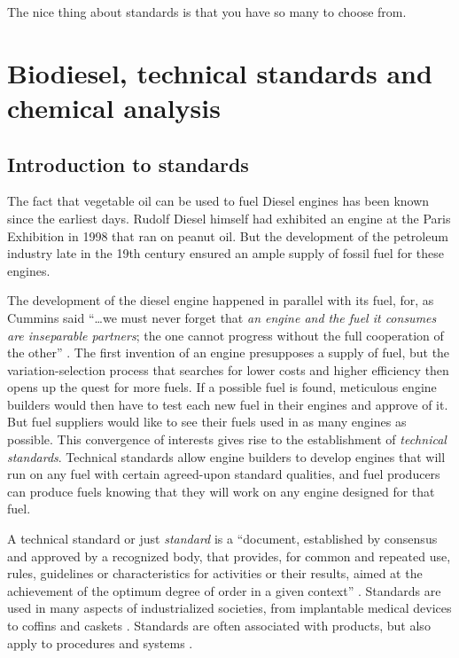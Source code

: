 
\begin{savequote}[\quotewidth]
The nice thing about standards is that you have so many to choose from.
\end{savequote}


\chapter[Biodiesel standards]{Biodiesel, technical standards and chemical analysis} %

\label{Chapter3} %

\section{Introduction to standards}
\label{Sec:Intro}

The fact that vegetable oil can be used to fuel Diesel engines has been known
since the earliest days. Rudolf Diesel himself had exhibited an engine at the
Paris Exhibition in 1998 \autocite{Knothe2010} that ran on peanut oil. But the
development of the petroleum industry late in the 19th century ensured an ample
supply of fossil fuel for these engines.

The development of the diesel engine happened in parallel with its fuel, for, as
Cummins said ``\ldots we must never forget that \textit{an engine and the fuel
it consumes are inseparable partners}; the one cannot progress without the full
cooperation of the other'' \autocite{Cummins1989}. The first invention of an
engine presupposes a supply of fuel, but the variation-selection process that
searches for lower costs and higher efficiency then opens up the quest for more
fuels. If a possible fuel is found, meticulous engine builders would then have
to test each new fuel in their engines and approve of it. But fuel suppliers
would like to see their fuels used in as many engines as possible. This
convergence of interests gives rise to the establishment of \textit{technical
standards}. Technical standards allow engine builders to develop engines that
will run on any fuel with certain agreed-upon standard qualities, and fuel
producers can produce fuels knowing that they will work on any engine designed
for that fuel.

A technical standard or just \textit{standard} is a ``document, established by
consensus and approved by a recognized body, that provides, for common and
repeated use, rules, guidelines or characteristics for activities or their
results, aimed at the achievement of the optimum degree of order in a given
context'' \autocite{Hatto2010}. Standards are used in many aspects of
industrialized societies, from implantable medical devices \autocite{ISO2019} to
coffins and caskets \autocite{SABS1993}. Standards are often associated with
products, but also apply to procedures \autocite{ISO2015} and systems
\autocite{ISO2017}.

